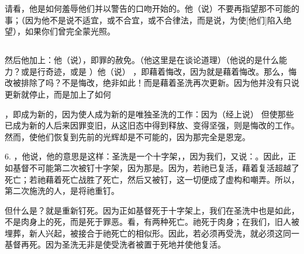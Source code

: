 请看，他是如何羞辱他们并以警告的口吻开始的。他（说）不要再指望那不可能的事；（因为他不是说不适宜，或不合宜，或不合律法，而是说，为使[他们]陷入绝望），如果你们曾完全蒙光照。\par


\subsection{}

然后他加上：他（说），即罪的赦免。（他这里是在谈论道理）（他说的是什么能力？或是行奇迹，或是 ）他（说） ，即藉着悔改，因为就是藉着悔改。那么，悔改被排除了吗？不是悔改，绝非如此！而是藉着圣洗再次更新。因为他并没有只说更新就停止，而是加上了如何\par

，即成为新的，因为使人成为新的是唯独圣洗的工作：因为（经上说）  但使那些已成为新的人后来因罪变旧，从这旧态中得到释放、变得坚强，则是悔改的工作。然而，使他们恢复到先前的光辉却是不可能的，因为那完全是恩宠。\par

6. ，他说，他的意思是这样：圣洗是一个十字架，，因为我们，又说：。因此，正如基督不可能第二次被钉十字架，因为那是。因为，若祂已复活，藉着复活超越了死亡；若祂藉着死亡战胜了死亡，然后又被钉，这一切便成了虚构和嘲弄。所以，第二次施洗的人，是将祂重钉。\par

但什么是？就是重新钉死。因为正如基督死于十字架上，我们在圣洗中也是如此，不是肉身上的死，而是死于罪恶。看，有两种死亡。祂死于肉身；在我们，旧人被埋葬，新人兴起，被接合于祂死亡的相似形。因此，若必须再受洗，就必须这同一基督再死。因为圣洗无非是使受洗者被置于死地并使他复活。\par

